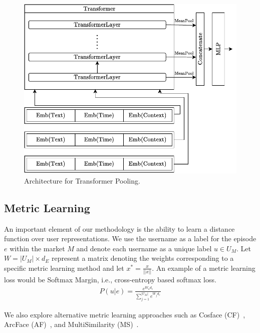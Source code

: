 \begin{figure}
    \centering
    \includegraphics[width=0.7\linewidth]{sysml/figures/EmbeddingTransformer.pdf}
    \caption{Architecture for Transformer Pooling.
    }
    \label{fig:emb_transformer}
\end{figure}

\subsection{Metric Learning}
\label{sec:framework:metric_learning}
An important element of our methodology is the ability to learn a distance function over user representations. We use the username as a label for the episode $e$ within the market $M$ and denote each username as a unique label $u \in U_M$.
Let $W =  |U_M| \times d_E $ represent a matrix denoting the weights corresponding to a specific metric learning method and let $x ^ * = \frac{x}{ || x||}$.
An example of a metric learning loss would be Softmax Margin, i.e., cross-entropy based softmax loss.
\begin{align*}
    P(u | e) = \frac{e^{W_{u} d_e}}{\sum\limits_{j=1}^{|U_M|}{e^{W_j d_e}}}
\end{align*}

We also explore alternative metric learning approaches such as Cosface (CF)~\cite{wang2018cosface}, ArcFace (AF)~\cite{deng2019arcface}, and MultiSimilarity (MS)~\cite{wang2019multi}. 

